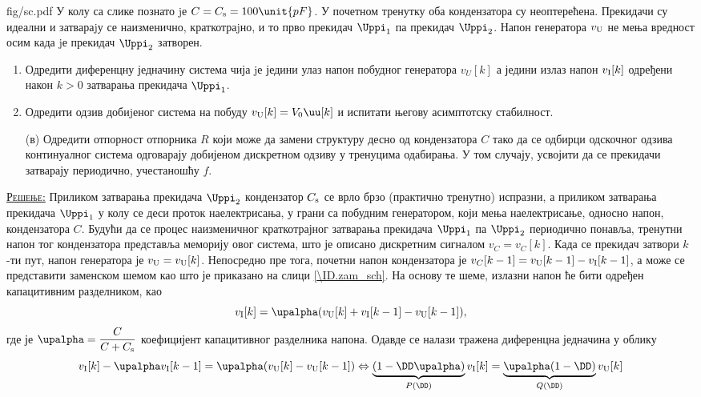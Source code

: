 \mnDifficult
\begin{slikaDesno}[0.833]{fig/sc.pdf}
    \PID
    У колу са слике познато jе $C = C_{\rm s} = 100\unit{pF}$. 
    У почетном тренутку оба кондензатора су неоптерећена.
Прекидачи су идеални и затвараjу се наизменично,
краткотраjно, и то прво прекидач $\Uppi_1$ па прекидач
$\Uppi_2$. Напон генератора $v_{\rm U}$ не мења вредност осим када
jе прекидач $\Uppi_2$ затворен.
\end{slikaDesno}
\begin{enumerate}[label=(\alph*)]
    \item Одредити диференцну једначину система чија jе
    једини улаз напон побудног генератора $v_U[k]$ а једини излаз напон 
    $v_{\rm I}[k]$ одређени након $k > 0$ затварања прекидача $\Uppi_1$.
    \item Одредити одзив добиjеног система на побуду $v_{\rm U}[k] = V_0 \uu[k]$ и 
    испитати његову асимптотску стабилност.
    \item[(в\textcolor{red}{\noway})] 
    Одредити отпорност отпорника $R$ који може да замени 
    структуру десно од кондензатора $C$ тако да се одбирци одскочног 
    одзива континуалног система одговарају добијеном дискретном одзиву у тренуцима 
    одабирања. У том случају, усвојити да се прекидачи затварају периодично, 
    учестаношћу $f$.
\end{enumerate}
\vspace*{2mm}

\textsc{\underline{Решење:}} Приликом затварања прекидача $\Uppi_2$ кондензатор $C_{\rm s}$ се врло брзо (практично тренутно) испразни, а 
приликом затварања прекидача $\Uppi_1$ у колу се деси проток наелектрисања, у грани са побудним генератором, који мења наелектрисање, односно напон, 
кондензатора $C$. Будући да се процес
наизменичног краткотрајног затварања прекидача $\Uppi_1$ па $\Uppi_2$ периодично понавља, тренутни напон тог кондензатора представља 
меморију овог система, што је описано дискретним сигналом $v_C = {v_C}[k]$. Када се прекидач затвори $k$-ти пут, напон генератора је 
$v_{\rm U} = v_{\rm U}[k]$. Непосредно пре тога, почетни напон кондензатора је $v_{C}[k-1] = v_{\rm U}[k-1] - v_{\rm I}[k-1]$, а
може се представити заменском шемом као што је приказано на слици \ref{\ID.zam_sch}. На основу те шеме, излазни напон ће бити 
одређен капацитивним разделником, као
\begin{equation}
    v_{\rm I}[k] = \upalpha (v_{\rm U}[k] + v_{\rm I}[k-1] - v_{\rm U}[k-1] ),
\end{equation}
где је $\upalpha =  \dfrac{C}{C + C_{\rm s}}$ коефицијент капацитивног разделника напона.
Одавде се налази тражена диференцна једначина у облику 
\begin{equation}
    v_{\rm I}[k] - \upalpha v_{\rm I}[k-1] = \upalpha( v_{\rm U}[k] - v_{\rm U}[k-1] ) 
    \Leftrightarrow
    \underbrace{( 1 - \DD \upalpha )}_{P(\DD)} v_{\rm I}[k] = \underbrace{\upalpha(1 - \DD)}_{Q(\DD)} v_{\rm U}[k]
\end{equation}


